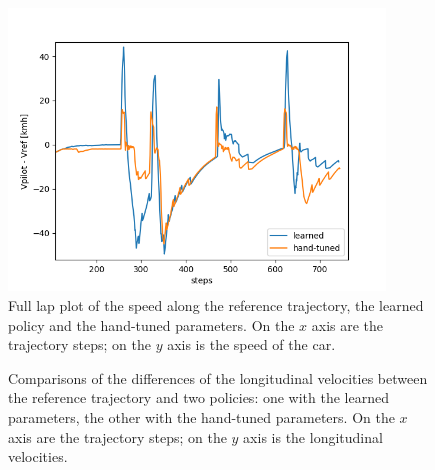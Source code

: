 \begin{figure}[H]
 \centering
  \captionsetup{width=10cm}
  \includegraphics[width=10cm]{./img/deltas_pois/delta_vx}
  \caption{Full lap plot of the speed along the reference trajectory, the learned policy and the hand-tuned parameters.  On the $x$ axis are the trajectory steps; on the $y$ axis is the speed of the car.}
   \label{fig:delta_vx}
\end{figure}

\begin{figure}[H]
\centering
{}
\hspace{3mm}
\caption{Comparisons of the differences of the longitudinal velocities between the reference trajectory and two policies: one with the learned parameters, the other with the hand-tuned parameters. On the $x$ axis are the trajectory steps; on the $y$ axis is the longitudinal velocities.}
\label{fig:deltavxexpl}
\end{figure}


